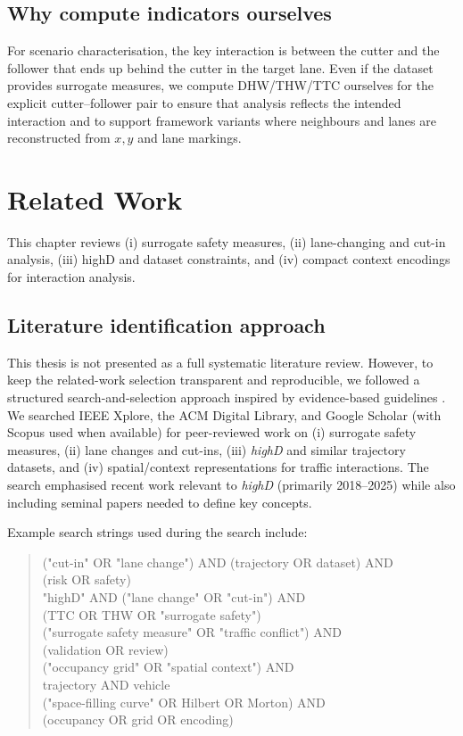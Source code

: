 \documentclass[12pt,a4paper,twoside,openright]{report}
\begin{document}
    \section{Why compute indicators ourselves}
    For scenario characterisation, the key interaction is between the cutter and the follower that ends up behind the cutter in the target lane. Even if the dataset provides surrogate measures, we compute DHW/THW/TTC ourselves for the explicit cutter--follower pair to ensure that analysis reflects the intended interaction and to support framework variants where neighbours and lanes are reconstructed from $x,y$ and lane markings.

    \chapter{Related Work}
    \label{chap:relatedwork}

    This chapter reviews (i) surrogate safety measures, (ii) lane-changing and cut-in analysis, (iii) highD and dataset constraints, and (iv) compact context encodings for interaction analysis.

    \section{Literature identification approach}
    This thesis is not presented as a full systematic literature review. However, to keep the related-work selection transparent and reproducible, we followed a structured search-and-selection approach inspired by evidence-based guidelines \cite{kitchenham2007,wohlin2014}. We searched IEEE Xplore, the ACM Digital Library, and Google Scholar (with Scopus used when available) for peer-reviewed work on (i) surrogate safety measures, (ii) lane changes and cut-ins, (iii) \textit{highD} and similar trajectory datasets, and (iv) spatial/context representations for traffic interactions. The search emphasised recent work relevant to \textit{highD} (primarily 2018--2025) while also including seminal papers needed to define key concepts.

    Example search strings used during the search include:
    \begin{quote}\small\ttfamily\raggedright
    ("cut-in" OR "lane change") AND (trajectory OR dataset) AND\\
    (risk OR safety)\\[2pt]
        "highD" AND ("lane change" OR "cut-in") AND\\
        (TTC OR THW OR "surrogate safety")\\[2pt]
        ("surrogate safety measure" OR "traffic conflict") AND\\
        (validation OR review)\\[2pt]
        ("occupancy grid" OR "spatial context") AND\\
        trajectory AND vehicle\\[2pt]
        ("space-filling curve" OR Hilbert OR Morton) AND\\
        (occupancy OR grid OR encoding)
    \end{quote}
\end{document}
